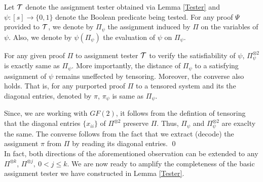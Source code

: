 \begin{definition} Let ${\cal T}$ denote the assignment tester
  obtained via Lemma \ref{Tester} and $\psi : [s] \rightarrow \{0,1\}$
  denote the Boolean predicate being tested. For any proof $\Psi$
  provided to ${\cal T}$, we denote by $\Pi_\psi$ the assignment
  induced by $\Pi$ on the variables of $\psi$. Also, we denote by
  $\psi(\Pi_\psi)$ the evaluation of $\psi$ on $\Pi_\psi$. 
\end{definition}

\begin{observation} \label{invariant} For any given proof $\Pi$ to
  assignment tester ${\cal T}$ to verify the satisfiability of $\psi$,
  $\Pi^{\otimes 2}_\psi$ is exactly same as $\Pi_\psi$. More
  importantly, the distance of $\Pi_\psi$ to a satisfying assignment
  of $\psi$ remains uneffected by tensoring. Moreover, the converse
  also holds. That is, for any purported proof $\Pi$ to a tensored
  system and its the diagonal entries, denoted by $\pi$, $\pi_\psi$ is
  same as $\Pi_\psi$.
\end{observation}
 Since, we are working with $GF(2)$, it
follows from the defintion of tensoring that the diagonal entries
$\{x_{ii}\}$ of $\Pi^{\otimes 2}$ preserve $\Pi$. Thus, $\Pi_\psi$ and
$\Pi^{\otimes 2}_\psi$ are exaclty the same. The converse follows from
the fact that we extract (decode) the assignment $\pi$ from $\Pi$ by
reading
its diagonal entries. \qed\\


In fact, both directions of the aforementioned observation can be
extended to any $\Pi^{\otimes k}$, $\Pi^{\otimes j}, \ 0 < j \le
k$. We are now ready to amplify the completeness of the basic
assignment tester we have constructed in Lemma \ref{Tester}.

